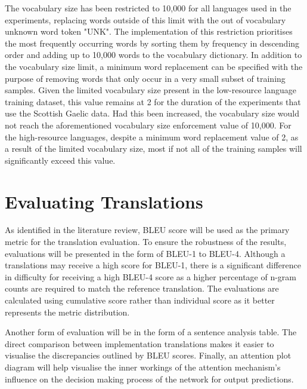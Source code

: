 The vocabulary size has been restricted to 10,000 for all languages used in the experiments, replacing words outside of this limit with the out of vocabulary unknown word token "UNK". The implementation of this restriction prioritises the most frequently occurring words by sorting them by frequency in descending order and adding up to 10,000 words to the vocabulary dictionary.
In addition to the vocabulary size limit, a minimum word replacement can be specified with the purpose of removing words that only occur in a very small subset of training samples. Given the limited vocabulary size present in the low-resource language training dataset, this value remains at 2 for the duration of the experiments that use the Scottish Gaelic data. Had this been increased, the vocabulary size would not reach the aforementioned vocabulary size enforcement value of 10,000. For the high-resource languages, despite a minimum word replacement value of 2, as a result of the limited vocabulary size, most if not all of the training samples will significantly exceed this value.



\section{Evaluating Translations}
\label{sec:3-evaluating}

As identified in the literature review, \acrshort{BLEU} score will be used as the primary metric for the translation evaluation. To ensure the robustness of the results, evaluations will be presented in the form of \acrshort{BLEU}-1 to \acrshort{BLEU}-4. Although a translations may receive a high score for \acrshort{BLEU}-1, there is a significant difference in difficulty for receiving a high \acrshort{BLEU}-4 score as a higher percentage of n-gram counts are required to match the reference translation. The evaluations are calculated using cumulative score rather than individual score as it better represents the metric distribution. 

Another form of evaluation will be in the form of a sentence analysis table. The direct comparison between implementation translations makes it easier to visualise the discrepancies outlined by \acrshort{BLEU} scores.
Finally, an attention plot diagram will help visualise the inner workings of the attention mechanism's influence on the decision making process of the network for output predictions.
